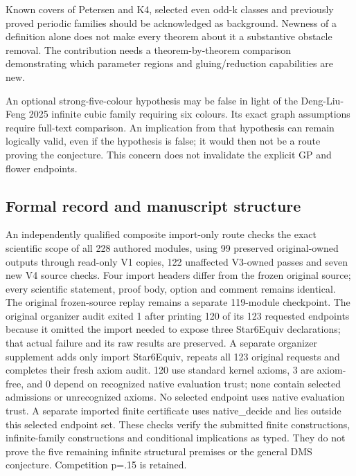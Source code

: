 \documentclass[11pt,a4paper]{article}
\begin{document}
\begin{samepage}
Known covers of Petersen and K4, selected even odd-k classes and previously proved periodic families should be acknowledged as background. Newness of a definition alone does not make every theorem about it a substantive obstacle removal. The contribution needs a theorem-by-theorem comparison demonstrating which parameter regions and gluing/reduction capabilities are new.

\end{samepage}
An optional strong-five-colour hypothesis may be false in light of the Deng-Liu-Feng 2025 infinite cubic family requiring six colours. Its exact graph assumptions require full-text comparison. An implication from that hypothesis can remain logically valid, even if the hypothesis is false; it would then not be a route proving the conjecture. This concern does not invalidate the explicit GP and flower endpoints.

\subsection{Formal record and manuscript structure}
An independently qualified composite import-only route checks the exact scientific scope of all 228 authored modules, using 99 preserved original-owned outputs through read-only V1 copies, 122 unaffected V3-owned passes and seven new V4 source checks. Four import headers differ from the frozen original source; every scientific statement, proof body, option and comment remains identical. The original frozen-source replay remains a separate 119-module checkpoint. The original organizer audit exited 1 after printing 120 of its 123 requested endpoints because it omitted the import needed to expose three Star6Equiv declarations; that actual failure and its raw results are preserved. A separate organizer supplement adds only import Star6Equiv, repeats all 123 original requests and completes their fresh axiom audit. 120 use standard kernel axioms, 3 are axiom-free, and 0 depend on recognized native evaluation trust; none contain selected admissions or unrecognized axioms. No selected endpoint uses native evaluation trust. A separate imported finite certificate uses native\_decide and lies outside this selected endpoint set. These checks verify the submitted finite constructions, infinite-family constructions and conditional implications as typed. They do not prove the five remaining infinite structural premises or the general DMS conjecture. Competition p=.15 is retained.
\end{document}
